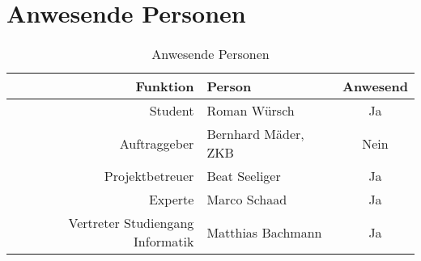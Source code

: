   \section{Anwesende Personen}
    
  \begin{table}[ht]
    \sffamily 
    \begin{center}
      \begin{tabular}{rlc}
        \toprule
        \textbf{Funktion} & \textbf{Person} & \textbf{Anwesend}\\
        \midrule
        Student & Roman Würsch & Ja\\
        Auftraggeber & Bernhard Mäder, ZKB & Nein\\
        Projektbetreuer & Beat Seeliger & Ja\\
        Experte & Marco Schaad & Ja\\
        Vertreter Studiengang Informatik & Matthias Bachmann & Ja\\
        \bottomrule
      \end{tabular}
      \captionsetup{list=no}
      \caption{Anwesende Personen}
      \label{tab:anwesendePersonen}
    \end{center}
  \end{table}



